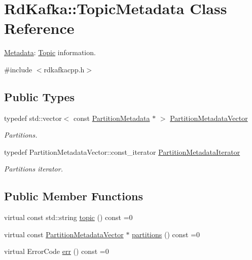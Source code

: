 \hypertarget{classRdKafka_1_1TopicMetadata}{
\section{RdKafka::TopicMetadata Class Reference}
\label{classRdKafka_1_1TopicMetadata}
}


\hyperlink{classRdKafka_1_1Metadata}{Metadata}: \hyperlink{classRdKafka_1_1Topic}{Topic} information.  


{\ttfamily \#include $<$rdkafkacpp.h$>$}\subsection*{Public Types}
\begin{DoxyCompactItemize}
\item 
\hypertarget{classRdKafka_1_1TopicMetadata_a79cef242d0f8c8630e7afac0ba3dfb55}{
typedef std::vector$<$ const \hyperlink{classRdKafka_1_1PartitionMetadata}{PartitionMetadata} $\ast$ $>$ \hyperlink{classRdKafka_1_1TopicMetadata_a79cef242d0f8c8630e7afac0ba3dfb55}{PartitionMetadataVector}}
\label{classRdKafka_1_1TopicMetadata_a79cef242d0f8c8630e7afac0ba3dfb55}

\begin{DoxyCompactList}\small\item\em Partitions. \item\end{DoxyCompactList}\item 
\hypertarget{classRdKafka_1_1TopicMetadata_aeef93f964b3c3dcde1067752be9f6508}{
typedef PartitionMetadataVector::const\_\-iterator \hyperlink{classRdKafka_1_1TopicMetadata_aeef93f964b3c3dcde1067752be9f6508}{PartitionMetadataIterator}}
\label{classRdKafka_1_1TopicMetadata_aeef93f964b3c3dcde1067752be9f6508}

\begin{DoxyCompactList}\small\item\em Partitions iterator. \item\end{DoxyCompactList}\end{DoxyCompactItemize}
\subsection*{Public Member Functions}
\begin{DoxyCompactItemize}
\item 
virtual const std::string \hyperlink{classRdKafka_1_1TopicMetadata_ac344fa7442c91d89a7d80a39816d9d9f}{topic} () const =0
\item 
virtual const \hyperlink{classRdKafka_1_1TopicMetadata_a79cef242d0f8c8630e7afac0ba3dfb55}{PartitionMetadataVector} $\ast$ \hyperlink{classRdKafka_1_1TopicMetadata_a12ab2dc3e052e307a749c90d467c211b}{partitions} () const =0
\item 
virtual ErrorCode \hyperlink{classRdKafka_1_1TopicMetadata_a01748dcf03bb40267856600a3221c4e0}{err} () const =0
\end{DoxyCompactItemize}


